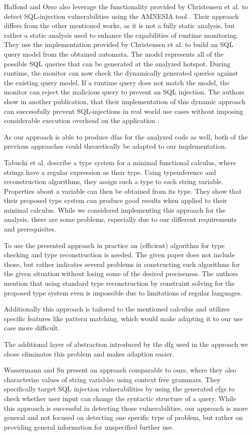 Halfond and Orso also leverage the functionality provided by Christensen et al. to detect SQL-injection vulnerabilities using the AMNESIA tool \cite{amnesia}. Their approach differs from the other mentioned works, as it is not a fully static analysis, but rather a static analysis used to enhance the capabilities of runtime monitoring. They use the implementation provided by Christensen et al. to build an SQL query model from the obtained automata. The model represents all of the possible SQL queries that can be generated at the analyzed hotspot.
During runtime, the monitor can now check the dynamically generated queries against the existing query model. If a runtime query does not match the model, the monitor can reject the malicious query to prevent an SQL injection. The authors show in another publication, that their implementation of this dynamic approach can successfully prevent SQL-injections in real world use cases without imposing considerable execution overhead on the application \cite{amnesia_evaluation}.

As our approach is able to produce \acp{dfa} for the analyzed code as well, both of the previous approaches could theoretically be adapted to our implementation.

Tabuchi et al. \cite{regex_types} describe a type system for a minimal functional calculus, where strings have a regular expression as their type. Using typeinference and reconstruction algorithms, they assign such a type to each string variable. Properties about a variable can then be obtained from its type.
They show that their proposed type system can produce good results when applied to their minimal calculus. While we considered implementing this approach for the analysis, there are some problems, especially due to our different requirements and prerequisites. 

To use the presented approach in practice an (efficient) algorithm for type checking and type reconstruction is needed. 
The given paper does not include those, but rather indicates several problems in constructing such algorithms for the given situation without losing some of the desired preciseness.
The authors mention that using standard type reconstruction by constraint solving for the proposed type system even is impossible due to limitations of regular languages.

Additionally this approach is tailored to the mentioned calculus and utilizes specific features like pattern matching, which would make adapting it to our use case more difficult.

The additional layer of abstraction introduced by the \ac{dfg} used in the approach we chose eliminates this problem and makes adaption easier.

Wassermann and Su \cite{sqli_wassermann_su} present an approach comparable to ours, where they also characterize values of string variables using context free grammars. They specifically target SQL injection vulnerabilities by using the generated \acp{cfg} to check whether user input can change the syntactic structure of a query. While this approach is successful in detecting those vulnerabilities, our approach is more general and not focused on detecting one specific type of problem, but rather on providing general information for unspecified further use.